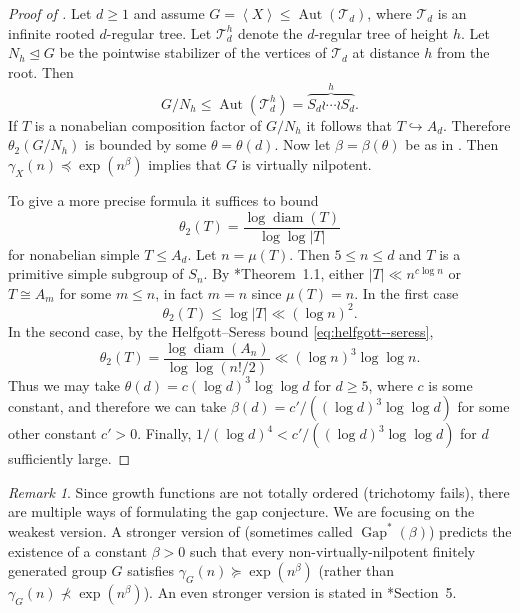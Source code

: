 \documentclass[11pt,reqno]{amsart}
\numberwithin{equation}{section}
\theoremstyle{definition}
\theoremstyle{remark}
\newtheorem{remark}[theorem]{Remark}
\def\T{\mathcal{T}} %
\newcommand\opr[1]{\operatorname{#1}}
\def\Aut{\opr{Aut}}
\def\diam{\opr{diam}}
\def\nsgp{\trianglelefteq}
\def\Gap{\opr{Gap}}
\newcommand\gen[1]{\left\langle#1\right\rangle}
\numberwithin{equation}{section}
\begin{document}
\begin{proof}[Proof of ]
    Let $d \ge 1$ and assume $G = \gen X \le \Aut(\T_d)$,
    where $\T_d$ is an infinite rooted $d$-regular tree.
    Let $\T_d^h$ denote the $d$-regular tree of height $h$.
    Let $N_h \nsgp G$ be the pointwise stabilizer of the vertices of $\T_d$ at distance $h$ from the root.
    Then
    \[
        G / N_h \le \Aut(\T_d^h) = \overbrace{S_d \wr \cdots \wr S_d}^h.
    \]
    If $T$ is a nonabelian composition factor of $G / N_h$ it follows that $T \hookrightarrow A_d$.
    Therefore $\theta_2(G / N_h)$ is bounded by some $\theta = \theta(d)$.
    Now let $\beta = \beta(\theta)$ be as in .
    Then $\gamma_X(n) \preceq \exp(n^\beta)$ implies that $G$ is virtually nilpotent.

    To give a more precise formula it suffices to bound
    \[
        \theta_2(T) = \frac{\log \diam(T)}{\log \log |T|}
    \]
    for nonabelian simple $T \le A_d$.
    Let $n = \mu(T)$. Then $5 \le n \le d$ and $T$ is a primitive simple subgroup of $S_n$.
    By \cite{maroti}*{Theorem~1.1}, either $|T| \ll n^{c \log n}$ or $T \cong A_m$ for some $m \le n$, in fact $m = n$ since $\mu(T) = n$.
    In the first case
    \[
        \theta_2(T) \le \log |T| \ll (\log n)^2.
    \]
    In the second case, by the Helfgott--Seress bound \eqref{eq:helfgott--seress},
    \[
        \theta_2(T) = \frac{\log \diam(A_n)}{\log \log (n!/2)} \ll (\log n)^3 \log \log n.
    \]
    Thus we may take $\theta(d) = c (\log d)^3 \log \log d$ for $d \ge 5$,
    where $c$ is some constant,
    and therefore we can take $\beta(d) = c' / ((\log d)^3 \log \log d)$ for some other constant $c' > 0$.
    Finally, $1 / (\log d)^4 < c' / ((\log d)^3 \log \log d)$ for $d$ sufficiently large.
\end{proof}

\begin{remark}
    Since growth functions are not totally ordered (trichotomy fails), there are multiple ways of formulating the gap conjecture.
    We are focusing on the weakest version.
    A stronger version of  (sometimes called $\Gap^*(\beta)$) predicts the existence of a constant $\beta > 0$ such that every non-virtually-nilpotent finitely generated group $G$ satisfies $\gamma_G(n) \succeq \exp(n^\beta)$ (rather than $\gamma_G(n) \not\prec \exp(n^\beta)$).
    An even stronger version is stated in \cite{EM25}*{Section~5}.
\end{remark}
\end{document}
